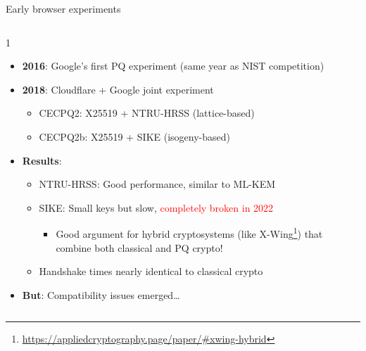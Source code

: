 \documentclass[aspectratio=169, lualatex]{beamer} %
\begin{document}
\begin{frame}{Early browser experiments}
	\begin{columns}[c]
		\begin{column}{1\textwidth}
			\begin{itemize}
				\item \textbf{2016}: Google's first PQ experiment (same year as NIST competition)
				\item \textbf{2018}: Cloudflare + Google joint experiment
				      \begin{itemize}
					      \item CECPQ2: X25519 + NTRU-HRSS (lattice-based)
					      \item CECPQ2b: X25519 + SIKE (isogeny-based)
				      \end{itemize}
				\item \textbf{Results}:
				      \begin{itemize}
					      \item NTRU-HRSS: Good performance, similar to ML-KEM
					      \item SIKE: Small keys but slow, \textcolor{red}{completely broken in 2022}
					            \begin{itemize}
						            \item Good argument for hybrid cryptosystems (like X-Wing\footnote{\url{https://appliedcryptography.page/paper/\#xwing-hybrid}}) that combine both classical and PQ crypto!
					            \end{itemize}
					      \item Handshake times nearly identical to classical crypto
				      \end{itemize}
				\item \textbf{But}: Compatibility issues emerged\ldots
			\end{itemize}
		\end{column}
	\end{columns}
\end{frame}
\end{document}
